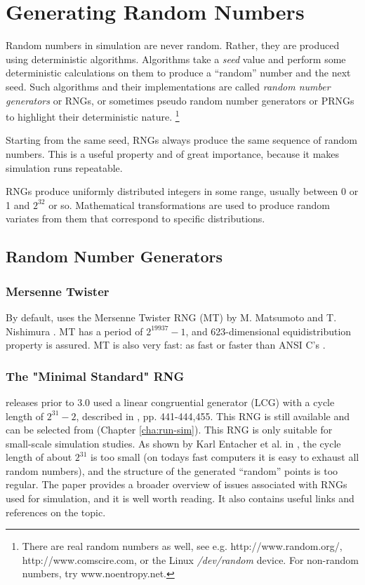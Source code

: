 \section{Generating Random Numbers}
\label{cha:sim-lib:generating-random-numbers}

Random numbers in simulation are never random. Rather, they are
produced using deterministic algorithms. Algorithms take a \textit{seed} value
and perform some deterministic calculations on them to produce
a ``random'' number and the next seed. Such algorithms and their
implementations are called \textit{random number generators} or RNGs,
or sometimes pseudo random number generators or PRNGs to highlight
their deterministic nature.
  \footnote{There are real random numbers as well, see e.g.
  http://www.random.org/, http://www.comscire.com, or the Linux
  \textit{/dev/random} device. For non-random numbers, try www.noentropy.net.}

Starting from the same seed, RNGs always produce the same sequence
of random numbers. This is a useful property and of great importance,
because it makes simulation runs repeatable.

RNGs produce uniformly distributed integers in some range,
usually between 0 or 1 and $2^{32}$ or so. Mathematical transformations
are used to produce random variates from them that correspond to
specific distributions.

\subsection{Random Number Generators}
\label{sec:sim-lib:rngs}

\subsubsection{Mersenne Twister}

By default, {\opp} uses the Mersenne Twister RNG (MT) by M. Matsumoto and
T. Nishimura \cite{Matsumoto98}. MT has a period of $2^{19937}-1$,
and 623-dimensional equidistribution property is assured. MT is
also very fast: as fast or faster than ANSI C's .

\subsubsection{The "Minimal Standard" RNG}

{\opp} releases prior to 3.0 used a linear congruential generator
(LCG) with a cycle length of $2^{31}-2$, described in
\cite{Jain91}, pp. 441-444,455. This RNG is still available
and can be selected from  (Chapter \ref{cha:run-sim}).
This RNG is only suitable for small-scale simulation studies.
As shown by Karl Entacher et al. in \cite{Entacher02},
the cycle length of about $2^{31}$ is too small (on todays
fast computers it is easy to exhaust all random numbers), and
the structure of the generated ``random'' points is too regular.
The \cite{Hellekalek98} paper provides a broader overview of issues
associated with RNGs used for simulation, and it is well worth reading.
It also contains useful links and references on the topic.

